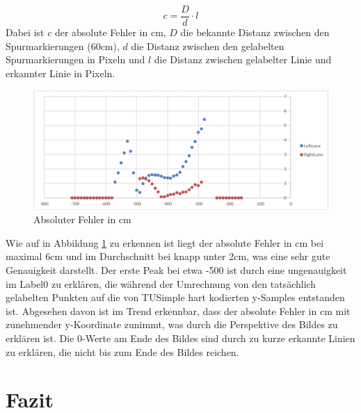\documentclass{article}
\begin{document}
            \begin{equation}
                 c = \frac{D}{d} \cdot l
            \end{equation}
            Dabei ist $c$ der absolute Fehler in cm, $D$ die bekannte Distanz zwischen den Spurmarkierungen (60cm), $d$ die Distanz zwischen den gelabelten Spurmarkierungen in Pixeln und $l$ die Distanz zwischen gelabelter Linie und erkannter Linie in Pixeln.

            \begin{figure}[h!]
                \includegraphics[width=\linewidth]{Auswertung_6e7e3724-test_103_absolut.png}
                \caption{Absoluter Fehler in cm}
                \label{fig:AbsoluterFehlerCm}
            \end{figure}

            Wie auf in Abbildung \ref{fig:AbsoluterFehlerCm} zu erkennen ist liegt der absolute Fehler in cm bei maximal 6cm und im Durchschnitt bei knapp unter 2cm, was eine sehr gute Genauigkeit darstellt.
            Der erste Peak bei etwa -500 ist durch eine ungenauigkeit im Label0 zu erklären, die während der Umrechnung von den tatsächlich gelabelten Punkten auf die von TUSimple hart kodierten y-Samples entstanden ist. 
            Abgesehen davon ist im Trend erkennbar, dass der absolute Fehler in cm mit zunehmender y-Koordinate zunimmt, was durch die Perspektive des Bildes zu erklären ist.
            Die 0-Werte am Ende des Bildes sind durch zu kurze erkannte Linien zu erklären, die nicht bis zum Ende des Bildes reichen.


    \section{Fazit}
\end{document}
